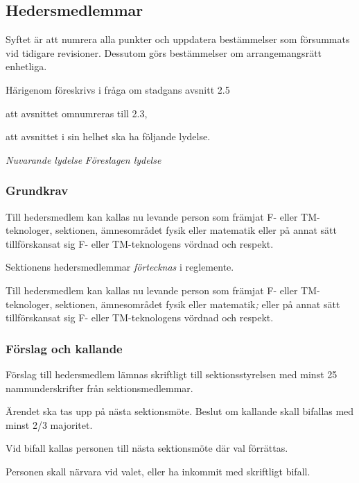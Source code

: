 \documentclass{article}
\newenvironment{lydelse}
    {\begin{paracol}{2}%
        \emph{Nuvarande lydelse}%
        \switchcolumn%
        \emph{Föreslagen lydelse}%
    \end{paracol}%
    \begin{enumerate}[label=\thesubsection.\arabic*]%
    \begin{paracol}{2}%
    }{\end{paracol}\end{enumerate}}
\newcommand{\itemb}{\item[\textbullet]}
\begin{document}
\setcounter{subsection}{2}
\subsection{Hedersmedlemmar}
Syftet är att numrera alla punkter och uppdatera bestämmelser som försummats vid tidigare revisioner.
Dessutom görs bestämmelser om arrangemangsrätt enhetliga.

Härigenom föreskrivs i fråga om stadgans avsnitt 2.5
\begin{dels}
    \item att avsnittet omnumreras till 2.3,
    \item att avsnittet i sin helhet ska ha följande lydelse.
\end{dels}

\begin{lydelse}%
    \subsubsection*{Grundkrav}
    \itemb Till hedersmedlem kan kallas nu levande person som främjat F- eller TM-tekno\-loger, sektionen, ämnesområdet fysik eller matematik eller på annat sätt till\-för\-skansat sig F- eller TM-tekno\-logens vördnad och respekt.
    \item[]
    
\switchcolumn
    \setcounter{subsection}{3}
    \item Sektionens hedersmedlemmar \emph{förtecknas} i reglemente.
    
    \item Till hedersmedlem kan kallas nu levande person som främjat F- eller TM-tekno\-loger, sektionen, ämnesområdet fysik eller matematik\emph{;} eller på annat sätt till\-för\-skansat sig F- eller TM-tekno\-logens vördnad och respekt.
    
\switchcolumn*
    \subsubsection*{Förslag och kallande}%
    \itemb Förslag till hedersmedlem lämnas skriftligt till sektionsstyrelsen med minst 25 namnunderskrifter från sektionsmedlemmar.

    \itemb Ärendet ska tas upp på nästa sektionsmöte. Beslut om kallande skall bifallas med minst 2/3 majoritet.
    
    \itemb Vid bifall kallas personen till nästa sektionsmöte där val förrättas.

    \itemb Personen skall närvara vid valet, eller ha inkommit med skriftligt bifall.


\end{lydelse}
\end{document}
